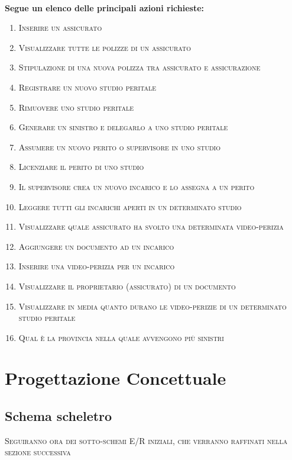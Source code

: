 \documentclass[a4paper,12pt]{report}
\begin{document}
\\
\textbf{Segue un elenco delle principali azioni richieste:}
\begin{enumerate}
    \item \textsc{Inserire un assicurato}
    \item \textsc{Visualizzare tutte le polizze di un assicurato}
    \item \textsc{Stipulazione di una nuova polizza tra assicurato e assicurazione}
    \item \textsc{Registrare un nuovo studio peritale}
    \item \textsc{Rimuovere uno studio peritale}
    \item \textsc{Generare un sinistro e delegarlo a uno studio peritale}
    \item \textsc{Assumere un nuovo perito o supervisore in uno studio}
    \item \textsc{Licenziare il perito di uno studio}
    \item \textsc{Il supervisore crea un nuovo incarico e lo assegna a un perito}
    \item \textsc{Leggere tutti gli incarichi aperti in un determinato studio}
    \item \textsc{Visualizzare quale assicurato ha svolto una determinata video-perizia}
    \item \textsc{Aggiungere un documento ad un incarico}
    \item \textsc{Inserire una video-perizia per un incarico}
    \item \textsc{Visualizzare il proprietario (assicurato) di un documento}
    \item \textsc{Visualizzare in media quanto durano le video-perizie di un determinato studio peritale}
    \item \textsc{Qual è la provincia nella quale avvengono più sinistri}
\end{enumerate}


\chapter{Progettazione Concettuale}

\section{Schema scheletro}

\textsc{Seguiranno ora dei sotto-schemi E/R iniziali, che verranno raffinati nella sezione successiva}
\end{document}
